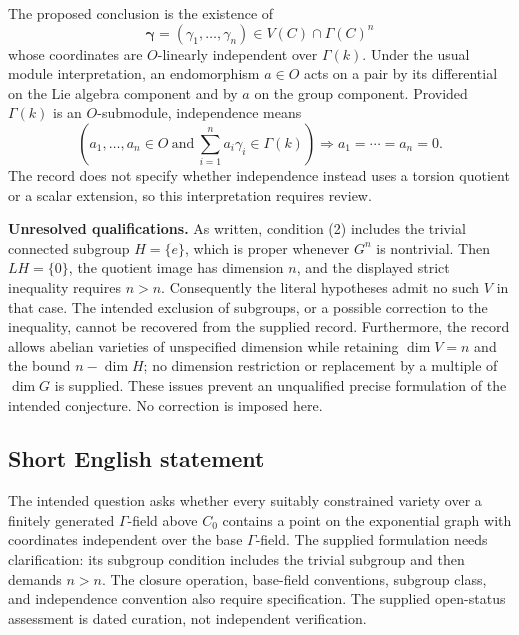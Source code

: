 \documentclass[11pt]{article}
\begin{document}
The proposed conclusion is the existence of
\[
\boldsymbol\gamma=(\gamma_1,\ldots,\gamma_n)
\in V(C)\cap\Gamma(C)^n
\]
whose coordinates are \(O\)-linearly independent over \(\Gamma(k)\). Under the usual module interpretation, an endomorphism \(a\in O\) acts on a pair by its differential on the Lie algebra component and by \(a\) on the group component. Provided \(\Gamma(k)\) is an \(O\)-submodule, independence means
\[
\left(a_1,\ldots,a_n\in O\ \text{and}\ 
\sum_{i=1}^n a_i\gamma_i\in\Gamma(k)\right)
\Longrightarrow a_1=\cdots=a_n=0.
\]
The record does not specify whether independence instead uses a torsion quotient or a scalar extension, so this interpretation requires review.

\textbf{Unresolved qualifications.} As written, condition (2) includes the trivial connected subgroup \(H=\{e\}\), which is proper whenever \(G^n\) is nontrivial. Then \(LH=\{0\}\), the quotient image has dimension \(n\), and the displayed strict inequality requires \(n>n\). Consequently the literal hypotheses admit no such \(V\) in that case. The intended exclusion of subgroups, or a possible correction to the inequality, cannot be recovered from the supplied record. Furthermore, the record allows abelian varieties of unspecified dimension while retaining \(\dim V=n\) and the bound \(n-\dim H\); no dimension restriction or replacement by a multiple of \(\dim G\) is supplied. These issues prevent an unqualified precise formulation of the intended conjecture. No correction is imposed here.
\subsection{Short English statement}
The intended question asks whether every suitably constrained variety over a finitely generated \(\Gamma\)-field above \(C_0\) contains a point on the exponential graph with coordinates independent over the base \(\Gamma\)-field. The supplied formulation needs clarification: its subgroup condition includes the trivial subgroup and then demands \(n>n\). The closure operation, base-field conventions, subgroup class, and independence convention also require specification. The supplied open-status assessment is dated curation, not independent verification.
\end{document}
